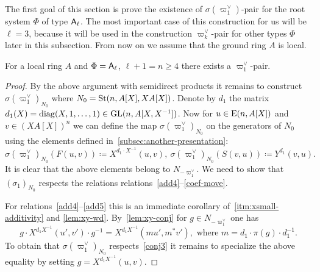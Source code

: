 The first goal of this section is prove the existence of $\sigma(\varpi_1^\vee)$-pair for the root system $\Phi$ of type $\mathsf{A}_\ell$.
The most important case of this construction for us will be $\ell = 3$, because it will be used in the construction $\varpi_k^\vee$-pair for other types $\Phi$ later in this subsection.
From now on we assume that the ground ring $A$ is local.

\begin{prop} \label{prop:sigma-construction}
    For a local ring $A$ and $\Phi = \mathsf{A}_\ell$, $\ell + 1 = n \geq 4$ there exists a $\varpi_1^\vee$-pair.
\end{prop}
\begin{proof}
    By the above argument with semidirect products it remains to construct $\sigma(\varpi_1^\vee)_{N_0}$ where $N_0 = \operatorname{St}(n, A[X], XA[X])$.
    Denote by $d_1$ the matrix $d_1(X) = \mathrm{diag}(X, 1, \ldots, 1) \in \operatorname{GL}(n, A[X, X^{-1}])$.
    Now for $u \in \operatorname{E}(n, A[X])$ and $v \in (XA[X])^n$ we can define the map $\sigma(\varpi_1^\vee)_{N_0}$ on the generators of $N_{0}$
    using the elements defined in~\cref{subsec:another-presentation}:
    \begin{equation*}
    \sigma(\varpi_1^\vee)_{N_0} (F(u, v)) \coloneqq X^{d_1 \cdot X^{-1}}(u, v),\ \sigma(\varpi_1^\vee)_{N_0} (S(v, u)) \coloneqq Y^{d_1}(v, u).
    \end{equation*}
    It is clear that the above elements belong to $N_{-\varpi_1^\vee}$.
    We need to show that $(\sigma_1)_{N_0}$ respects the relations relations~\eqref{add4}--\eqref{coef-move}.

    For relations~\eqref{add4}--\eqref{add5} this is an immediate corollary of~\cref{itm:xsmall-additivity} and \cref{lem:xy-wd}.
    By~\cref{lem:xy-conj} for $g \in N_{-\varpi_1^\vee}$ one has
    \begin{equation}
        \label{eq:xy-conj-n1}
        g \cdot X^{d_1 X^{-1}}(u', v') \cdot g^{-1} = X^{d_1 X^{-1}}(mu', m^*v'), \text{ where } m = d_1 \cdot \pi(g) \cdot d_1^{-1}.
    \end{equation}
    To obtain that $\sigma(\varpi_1^\vee)_{N_0}$ respects~\eqref{conj3} it remains to specialize the above equality by setting $g = X^{d_1 X^{-1}}(u, v)$.


\end{proof}
